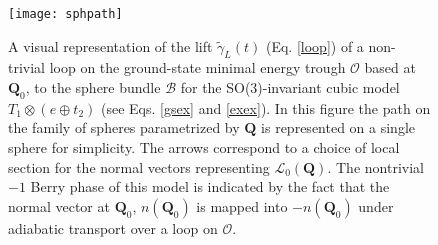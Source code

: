 \documentclass[superscriptaddress,showpacs,amsmath,amssymb,pra,twocolumn]{revtex4-1}
\begin{document}
\begin{figure}
\texttt{[image: sphpath]}
\caption{A visual representation of the lift $\tilde{\gamma}_{L}(t)$ (Eq.
\ref{loop}) of a non-trivial loop on the ground-state minimal energy
trough $\mathcal{O}$ based at $\mathbf{Q}_{0}$, to the sphere bundle
$\mathcal{B}$ for the SO(3)-invariant cubic model $T_{1}\otimes(e\oplus t_{2})$
\cite{obrien_dynamic_1969-2} (see Eqs. \ref{gsex} and \ref{exex}).
In this figure the path on the family of spheres parametrized by $\mathbf{Q}$
is represented on a single sphere for simplicity. The arrows correspond
to a choice of local section for the normal vectors representing $\mathcal{L}_{0}(\mathbf{Q})$.
The nontrivial $-1$ Berry phase of this model is indicated by the fact
that the normal vector at $\mathbf{Q}_{0}$, $n(\mathbf{Q}_{0})$
is mapped into $-n(\mathbf{Q}_{0})$ under adiabatic transport over
a loop on $\mathcal{O}$.}
\label{spherebuncurve} 
\end{figure}
\end{document}
